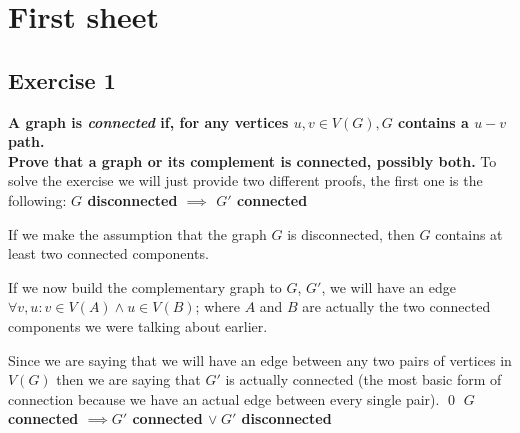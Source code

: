 \section*{First sheet}
\subsection*{Exercise 1} 
\boldmath \textbf{A graph is \textit{connected} if, for any vertices $u, v \in V(G), G$ contains a 
$u - v$ path.\\
Prove that a graph or its complement is connected, possibly both.} \spacer \unboldmath 
To solve the exercise we will just provide two different proofs, the first one is the following:
\spacer \boldmath 
\textbf{$G$ disconnected $\implies$ $G'$ connected}\vspace{5pt} \unboldmath 

If we make the assumption that the graph $G$ is disconnected, then $G$ contains at least two 
connected components.

If we now build the complementary graph to $G$, $G'$, we will have an edge $\forall v, u : v \in 
V(A) \land u \in V(B)$; where $A$ and $B$ are actually the two connected components we were talking 
about earlier.

Since we are saying that we will have an edge between any two pairs of vertices in $V(G)$ then we
are saying that $G'$ is actually connected (the most basic form of connection because we have an
actual edge between every single pair). \qed \spacer
\boldmath \textbf{$G$ connected $\implies G'$ connected $\vee\hspace{3pt} G'$
disconnected}\vspace{5pt} \unboldmath 

